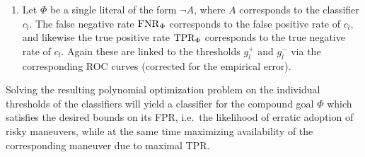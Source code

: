 \begin{enumerate}
\item Let $\Phi$ be a single literal of the form $\lnot A$,
  where $A$ corresponds to the classifier $c_l$.
  The false negative rate $\mathrm{FNR}_\Phi$ corresponds to the false positive rate
  of $c_l$, and likewise the true positive rate $\mathrm{TPR}_\Phi$ corresponds to the true negative rate of $c_l$. Again these are linked to the thresholds $g_l^+$ and $g_l^-$ via the corresponding ROC curves (corrected for the empirical error).  %
  
\end{enumerate}
Solving the resulting polynomial optimization problem on the individual thresholds of the classifiers will yield a classifier for the compound goal $\Phi$ which satisfies the desired bounds on its FPR, i.e.\ the likelihood of erratic adoption of risky maneuvers, while at the same time maximizing availability of the corresponding maneuver due to  maximal TPR.
%
%

